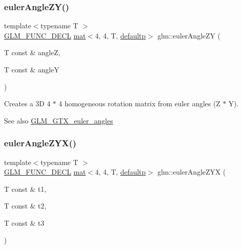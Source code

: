 \subsubsection{\texorpdfstring{euler\+Angle\+Z\+Y()}{eulerAngleZY()}}
{\footnotesize\ttfamily template$<$typename T $>$ \\
\mbox{\hyperlink{setup_8hpp_ab2d052de21a70539923e9bcbf6e83a51}{G\+L\+M\+\_\+\+F\+U\+N\+C\+\_\+\+D\+E\+CL}} \mbox{\hyperlink{structglm_1_1mat}{mat}}$<$4, 4, T, \mbox{\hyperlink{namespaceglm_a36ed105b07c7746804d7fdc7cc90ff25a9d21ccd8b5a009ec7eb7677befc3bf51}{defaultp}}$>$ glm\+::euler\+Angle\+ZY (\begin{DoxyParamCaption}\item[{T const \&}]{angleZ,  }\item[{T const \&}]{angleY }\end{DoxyParamCaption})}

Creates a 3D 4 $\ast$ 4 homogeneous rotation matrix from euler angles (Z $\ast$ Y). \begin{DoxySeeAlso}{See also}
\mbox{\hyperlink{group__gtx__euler__angles}{G\+L\+M\+\_\+\+G\+T\+X\+\_\+euler\+\_\+angles}} 
\end{DoxySeeAlso}
\mbox{\label{group__gtx__euler__angles_ga2e61f1e39069c47530acab9167852dd6}} 
\subsubsection{\texorpdfstring{euler\+Angle\+Z\+Y\+X()}{eulerAngleZYX()}}
{\footnotesize\ttfamily template$<$typename T $>$ \\
\mbox{\hyperlink{setup_8hpp_ab2d052de21a70539923e9bcbf6e83a51}{G\+L\+M\+\_\+\+F\+U\+N\+C\+\_\+\+D\+E\+CL}} \mbox{\hyperlink{structglm_1_1mat}{mat}}$<$4, 4, T, \mbox{\hyperlink{namespaceglm_a36ed105b07c7746804d7fdc7cc90ff25a9d21ccd8b5a009ec7eb7677befc3bf51}{defaultp}}$>$ glm\+::euler\+Angle\+Z\+YX (\begin{DoxyParamCaption}\item[{T const \&}]{t1,  }\item[{T const \&}]{t2,  }\item[{T const \&}]{t3 }\end{DoxyParamCaption})}

